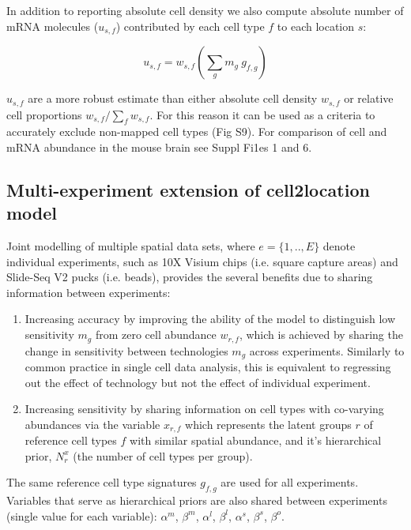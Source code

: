 \documentclass[11pt,a4paper]{article}
\begin{document}
In addition to reporting absolute cell density we also compute absolute number of mRNA molecules ($u_{s,f}$) contributed by each cell type $f$ to each location $s$:
\begin{linenomath*} \begin{equation} \label{eq:c2l:24}
u_{s,f} = w_{s,f} (\sum_{g} {m_{g} \: g_{f,g}})
\end{equation} \end{linenomath*}
$u_{s,f}$ are a more robust estimate than either absolute cell density $w_{s,f}$ or relative cell proportions $w_{s,f} / \sum_{f} w_{s,f}$. For this reason it can be used as a criteria to accurately exclude non-mapped cell types (Fig S9). For comparison of cell and mRNA abundance in the mouse brain see Suppl Fi1es 1 and 6. \newline

\subsection{Multi-experiment extension of cell2location model} \label{c2l_multi}

Joint modelling of multiple spatial data sets, where $e=\{1,..,E\}$ denote individual experiments, such as 10X Visium chips (i.e. square capture areas) and Slide-Seq V2 pucks (i.e. beads), provides the several benefits due to sharing information between experiments:

\begin{enumerate}

    \item Increasing accuracy by improving the ability of the model to distinguish low sensitivity $m_{g}$ from zero cell abundance $w_{r,f}$, which is achieved by sharing the change in sensitivity between technologies $m_{g}$ across experiments. Similarly to common practice in single cell data analysis, this is equivalent to regressing out the effect of technology but not the effect of individual experiment.
    
    \item Increasing sensitivity by sharing information on cell types with co-varying abundances via the variable $x_{r,f}$ which represents the latent groups $r$ of reference cell types $f$ with similar spatial abundance, and it's hierarchical prior, $N_r^{x}$ (the number of cell types per group).
    
\end{enumerate}

The same reference cell type signatures $g_{f,g}$ are used for all experiments. Variables that serve as hierarchical priors are also shared between experiments (single value for each variable): $\alpha^m$, $\beta^m$, $\alpha^l$, $\beta^l$, $\alpha^s$, $\beta^s$, $\beta^o$.
\end{document}
